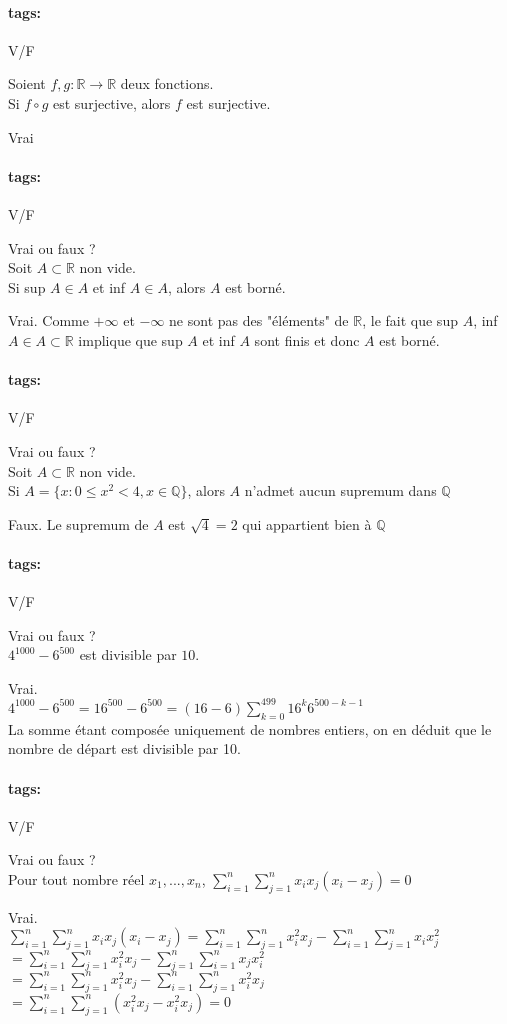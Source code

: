 \documentclass[12pt]{article}
\newcommand*{\xfield}[1]{\begin{mdframed}\centering #1\end{mdframed}\bigskip}
\newenvironment{note}{}{}
\newcommand*{\tags}[1]{\paragraph{tags: }#1}
\begin{document}
\begin{note}
\tags{V/F}
	\xfield{Soient $f, g : \mathbb{R} \to \mathbb{R}$ deux fonctions.\\
	Si $f \circ g$ est surjective, alors $f$ est surjective.}
	\xfield{Vrai}
\end{note}

\begin{note}
\tags{V/F}
	\xfield{Vrai ou faux ?\\
	Soit $A \subset \mathbb{R}$ non vide.\\
	Si sup $A \in A$ et inf $A \in A$, alors $A$ est borné.}
	\xfield{Vrai. Comme $+\infty$ et $-\infty$ ne sont pas des "éléments" de $\mathbb{R}$, le fait que sup $A$, inf $A \in A \subset \mathbb{R}$ implique que sup $A$ et inf $A$ sont finis et donc $A$ est borné.}
\end{note}

\begin{note}
\tags{V/F}
	\xfield{Vrai ou faux ?\\
	Soit $A \subset \mathbb{R}$ non vide.\\
	Si $A = \{x:0 \le x^2 < 4, x \in \mathbb{Q}\}$, alors $A$ n'admet aucun supremum dans $\mathbb{Q}$}
	\xfield{Faux. Le supremum de $A$ est $\sqrt{4} = 2$ qui appartient bien à $\mathbb{Q}$}
\end{note}

\begin{note}
\tags{V/F}
	\xfield{Vrai ou faux ?\\
	$4^{1000} - 6^{500}$ est divisible par $10$.}
	\xfield{Vrai.\\
	$4^{1000} - 6^{500} = 16^{500} - 6^{500} = (16-6) \sum\limits^{499}_{k=0}16^k 6^{500-k-1}$\\
	La somme étant composée uniquement de nombres entiers, on en déduit que le nombre de départ est divisible par 10.}
\end{note}

\begin{note}
\tags{V/F}
	\xfield{Vrai ou faux ?\\
	Pour tout nombre réel $x_1,...,x_n$, $\sum\limits^{n}_{i=1} \sum\limits^{n}_{j=1} x_i x_j (x_i-x_j) = 0$}
	\xfield{Vrai.\\
	$\sum\limits^{n}_{i=1} \sum\limits^{n}_{j=1} x_i x_j (x_i-x_j) = \sum\limits^{n}_{i=1} \sum\limits^{n}_{j=1} x_i^2 x_j - \sum\limits^{n}_{i=1} \sum\limits^{n}_{j=1} x_i x_j^2 $\\
	$=\sum\limits^{n}_{i=1} \sum\limits^{n}_{j=1} x_i^2 x_j - \sum\limits^{n}_{j=1} \sum\limits^{n}_{i=1} x_j x_i^2 $\\
	$=\sum\limits^{n}_{i=1} \sum\limits^{n}_{j=1} x_i^2 x_j - \sum\limits^{n}_{i=1} \sum\limits^{n}_{j=1} x_i^2 x_j $\\
	$= \sum\limits^{n}_{i=1} \sum\limits^{n}_{j=1} (x_i^2 x_j - x_i^2 x_j) = 0$
	}
\end{note}
\end{document}
